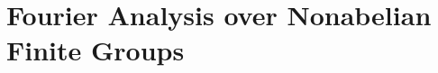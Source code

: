 \documentclass{../quantum.tex}
\begin{document}
\section{Fourier Analysis over Nonabelian Finite Groups}
\end{document}
